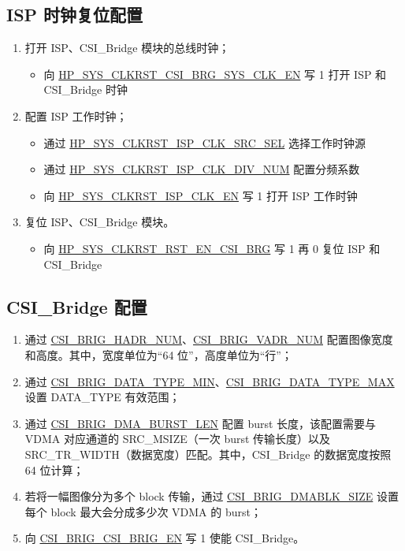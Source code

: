 \documentclass[main\_\_CN.tex]{subfiles}
\begin{document}
\subsection{ISP 时钟复位配置}
\label{sec:isp_clkrst_proc}
\begin{enumerate}
    \item 打开 ISP、CSI\_Bridge 模块的总线时钟；
    \begin{itemize}
        \item 向 \hyperref[fielddesc:HPSYSCLKRSTCSIBRGSYSCLKEN]{HP\_SYS\_CLKRST\_CSI\_BRG\_SYS\_CLK\_EN} 写 1 打开 ISP 和 CSI\_Bridge 时钟
    \end{itemize}
    \item 配置 ISP 工作时钟；
    \begin{itemize}
        \item 通过 \hyperref[fielddesc:HPSYSCLKRSTISPCLKSRCSEL]{HP\_SYS\_CLKRST\_ISP\_CLK\_SRC\_SEL} 选择工作时钟源
        \item 通过 \hyperref[fielddesc:HPSYSCLKRSTISPCLKDIVNUM]{HP\_SYS\_CLKRST\_ISP\_CLK\_DIV\_NUM} 配置分频系数
        \item 向 \hyperref[fielddesc:HPSYSCLKRSTISPCLKEN]{HP\_SYS\_CLKRST\_ISP\_CLK\_EN} 写 1 打开 ISP 工作时钟
    \end{itemize}
    \item 复位 ISP、CSI\_Bridge 模块。
    \begin{itemize}
        \item 向 \hyperref[fielddesc:HPSYSCLKRSTRSTENCSIBRG]{HP\_SYS\_CLKRST\_RST\_EN\_CSI\_BRG} 写 1 再 0 复位 ISP 和 CSI\_Bridge
    \end{itemize}
\end{enumerate}

\subsection{CSI\_Bridge 配置}
\label{sec:isp_csi_bridge_proc}
\begin{enumerate}
    \item 通过 \hyperref[fielddesc:CSIBRIGHADRNUM]{CSI\_BRIG\_HADR\_NUM}、\hyperref[fielddesc:CSIBRIGVADRNUM]{CSI\_BRIG\_VADR\_NUM} 配置图像宽度和高度。其中，宽度单位为“64 位”，高度单位为“行”；

    \item 通过 \hyperref[fielddesc:CSIBRIGDATATYPEMIN]{CSI\_BRIG\_DATA\_TYPE\_MIN}、\hyperref[fielddesc:CSIBRIGDATATYPEMAX]{CSI\_BRIG\_DATA\_TYPE\_MAX} 设置 DATA\_TYPE 有效范围；

    \item 通过 \hyperref[fielddesc:CSIBRIGDMABURSTLEN]{CSI\_BRIG\_DMA\_BURST\_LEN} 配置 burst 长度，该配置需要与 VDMA 对应通道的 SRC\_MSIZE（一次 burst 传输长度）以及 SRC\_TR\_WIDTH（数据宽度）匹配。其中，CSI\_Bridge 的数据宽度按照 64 位计算；

    \item 若将一幅图像分为多个 block 传输，通过 \hyperref[fielddesc:CSIBRIGDMABLKSIZE]{CSI\_BRIG\_DMABLK\_SIZE} 设置每个 block 最大会分成多少次 VDMA 的 burst；

    \item 向 \hyperref[fielddesc:CSIBRIGCSIBRIGEN]{CSI\_BRIG\_CSI\_BRIG\_EN} 写 1 使能 CSI\_Bridge。
\end{enumerate}
\end{document}
